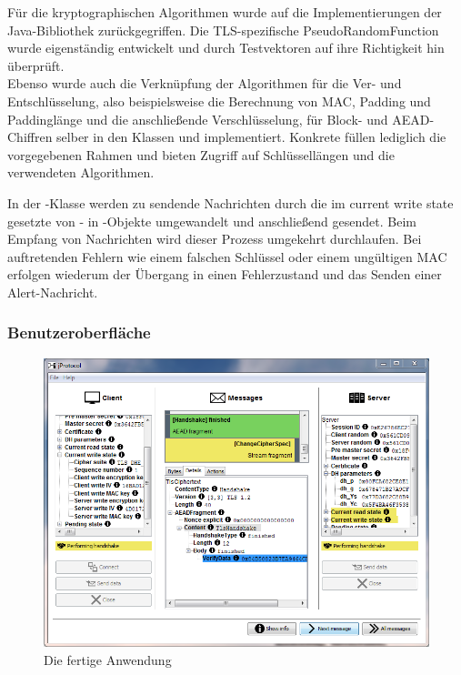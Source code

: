 Für die kryptographischen Algorithmen wurde auf die Implementierungen der Java-Bibliothek zurückgegriffen. Die TLS-spezifische PseudoRandomFunction wurde eigenständig entwickelt und durch Testvektoren auf ihre Richtigkeit hin überprüft.\\
Ebenso wurde auch die Verknüpfung der Algorithmen für die Ver- und Entschlüsselung, also beispielsweise die Berechnung von MAC, Padding und Paddinglänge und die anschließende Verschlüsselung, für Block- und AEAD-Chiffren selber in den Klassen  und  implementiert. Konkrete \ciphersuites{} füllen lediglich die vorgegebenen Rahmen und bieten Zugriff auf Schlüssellängen und die verwendeten Algorithmen.

In der -Klasse werden zu sendende Nachrichten durch die im current write state gesetzte \ciphersuite{} von - in -Objekte umgewandelt und anschließend gesendet. Beim Empfang von Nachrichten wird dieser Prozess umgekehrt durchlaufen. Bei auftretenden Fehlern wie einem falschen Schlüssel oder einem ungültigen MAC erfolgen wiederum der Übergang in einen Fehlerzustand und das Senden einer Alert-Nachricht.

\subsubsection{Benutzeroberfläche}
\begin{figure}
	\centering
	\includegraphics[scale=0.7]{Diagrams/ScreenshotTLS.png} 
	\caption{Die fertige Anwendung}
	\label{fig_application_screenshot}
\end{figure}

